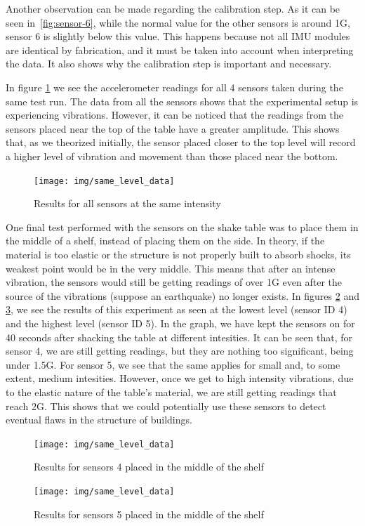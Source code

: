 Another observation can be made regarding the calibration step. As it can be seen in~\ref{fig:sensor-6}, while the normal value for the other sensors is around 1G, sensor 6 is
slightly below this value. This happens because not all IMU modules are identical by fabrication, and it must be taken into account when interpreting the data. It also shows 
why the calibration step is important and necessary.

In figure \ref{fig:same-level} we see the accelerometer readings for all 4 sensors taken during the same test run. The data from all the sensors shows 
that the experimental setup is experiencing vibrations. However, it can be noticed that the readings from the sensors placed near the top of the table have a 
greater amplitude. This shows that, as we theorized initially, the sensor placed closer to the top level will record a higher level of vibration and movement than 
those placed near the bottom.

\begin{figure}[ht] \centering
  \texttt{[image: img/same\_level\_data]}
  \caption{Results for all sensors at the same intensity}
  \label{fig:same-level}
\end{figure}

One final test performed with the sensors on the shake table was to place them in the middle of a shelf, instead of placing them on the side. In theory, if the material is too elastic 
or the structure is not properly built to absorb shocks, its weakest point would be in the very middle. This means that after an intense vibration, the sensors would still be getting 
readings of over 1G even after the source of the vibrations (suppose an earthquake) no longer exists. In figures \ref{fig:middle-4} and \ref{fig:middle-5}, we see the results of this 
experiment as seen at the lowest level (sensor ID 4) and the highest level (sensor ID 5). In the graph, we have kept the sensors on for 40 seconds after shacking the table at different 
intesities. It can be seen that, for sensor 4, we are still getting readings, but they are nothing too significant, being under 1.5G. For sensor 5, we see that the same applies for small 
and, to some extent, medium intesities. However, once we get to high intensity vibrations, due to the elastic nature of the table's material, we are still getting readings that reach 2G.
This shows that we could potentially use these sensors to detect eventual flaws in the structure of buildings.

\begin{figure}[ht] \centering
  \texttt{[image: img/same\_level\_data]}
  \caption{Results for sensors 4 placed in the middle of the shelf}
  \label{fig:middle-4}
\end{figure}

\begin{figure}[ht] \centering
  \texttt{[image: img/same\_level\_data]}
  \caption{Results for sensors 5 placed in the middle of the shelf}
  \label{fig:middle-5}
\end{figure}

